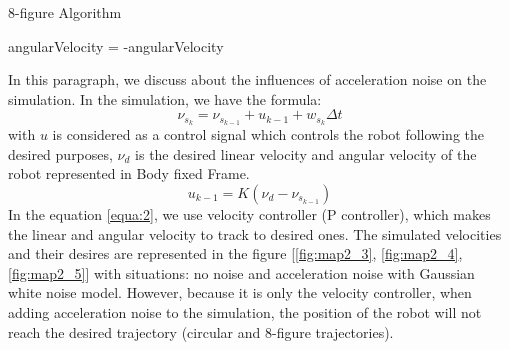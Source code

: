 \documentclass[letterpaper,12pt]{article}
\begin{document}
\begin{algorithm}
\caption{8-figure Algorithm}\label{alg:1}
\begin{algorithmic}
\State angularVelocity = -angularVelocity
\\
\EndIf
\end{algorithmic}
\end{algorithm}

\noindent
In this paragraph, we discuss about the influences of acceleration noise on the simulation. In the simulation, we have the formula:
\begin{equation}
\label{equa:1}
\nu_{s_{k}} = \nu_{s_{k-1}} + u_{k-1} + w_{s_k} \Delta t
\end{equation}
with $u$ is considered as a control signal which controls the robot following the desired purposes, $\nu_{d}$ is the desired linear velocity and angular velocity of the robot represented in Body fixed Frame.
\begin{equation}
\label{equa:2}
u_{k-1} = K (\nu_{d} - \nu_{s_{k-1}})
\end{equation}
In the equation \ref{equa:2}, we use velocity controller (P controller), which makes the linear and angular velocity to track to desired ones. The simulated velocities and their desires are represented in the figure [\ref{fig:map2_3}, \ref{fig:map2_4}, \ref{fig:map2_5}] with situations: no noise and acceleration noise with Gaussian white noise model. However, because it is only the velocity controller, when adding acceleration noise to the simulation, the position of the robot will not reach the desired trajectory (circular and 8-figure trajectories).
\end{document}
